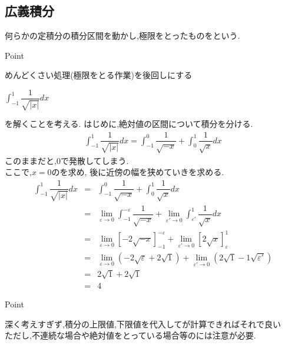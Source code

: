 \documentclass[a4paper]{jsarticle}
\begin{document}
\subsection{広義積分}
何らかの定積分の積分区間を動かし,極限をとったものをという.\\
\begin{itembox}[l]{Point}
    \begin{center}
        めんどくさい処理(極限をとる作業)を後回しにする
    \end{center}
\end{itembox}
\begin{center}
    $\displaystyle\int ^1_{-1} \dfrac{1}{\sqrt{|x|}}dx$
\end{center}
を解くことを考える.
はじめに,絶対値の区間について積分を分ける.
\begin{eqnarray*}
    \displaystyle\int ^1_{-1} \dfrac{1}{\sqrt{|x|}}dx=\int ^0_{-1} \dfrac{1}{\sqrt{-x}}+\int ^1_{0} \dfrac{1}{\sqrt{x}}dx
\end{eqnarray*}
このままだと,$0$で発散してしまう.\\
ここで,$x=0$のを求め,
後に近傍の幅を狭めていきを求める.
\begin{eqnarray*}
    \displaystyle
    \int ^1_{-1} \dfrac{1}{\sqrt{|x|}}dx&=&\int ^0_{-1} \dfrac{1}{\sqrt{-x}}+\int ^1_{0} \dfrac{1}{\sqrt{x}}dx\\
    &=&\lim_{\varepsilon\rightarrow 0}\int ^{-\varepsilon}_{-1} \dfrac{1}{\sqrt{-x}}+\lim_{\varepsilon'\rightarrow 0}\int ^1_{\varepsilon'} \dfrac{1}{\sqrt{x}}dx\\
    &=&\lim_{\varepsilon\rightarrow 0}\left[-2\sqrt{-x}\right]^{-\varepsilon}_{-1}+\lim_{\varepsilon'\rightarrow0}\left[2\sqrt{x}\right]^{1}_{\varepsilon}\\
    &=&\lim_{\varepsilon\rightarrow 0}\left(-2\sqrt{\varepsilon}+2\sqrt{1}\right)+\lim_{\varepsilon'\rightarrow0}\left(2\sqrt{1}-1\sqrt{\varepsilon'}\right)\\
    &=&2\sqrt{1}+2\sqrt{1}\\
    &=&4
\end{eqnarray*}
\begin{itembox}[l]{Point}
    \begin{center}
        深く考えすぎず,積分の上限値,下限値を代入してが計算できればそれで良い\\
        ただし,不連続な場合や絶対値をとっている場合等のには注意が必要.
    \end{center}
\end{itembox}
\end{document}
